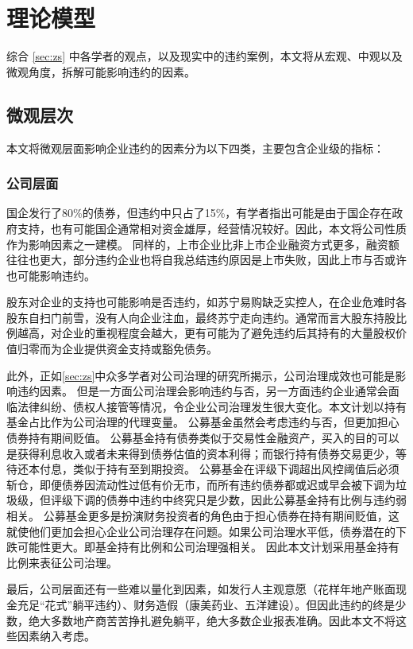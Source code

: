 
\chapter{理论模型}
综合 \ref{sec:zs} 中各学者的观点，以及现实中的违约案例，本文将从宏观、中观以及微观角度，拆解可能影响违约的因素。
\section{微观层次}
本文将微观层面影响企业违约的因素分为以下四类，主要包含企业级的指标：
\subsection{公司层面}

国企发行了80\%的债券，但违约中只占了15\%，有学者指出可能是由于国企存在政府支持\cite{mo2021china}，也有可能国企通常相对资金雄厚，经营情况较好。因此，本文将公司性质作为影响因素之一建模。
同样的，上市企业比非上市企业融资方式更多，融资额往往也更大，部分违约企业也将自我总结违约原因是上市失败，因此上市与否或许也可能影响违约。

股东对企业的支持也可能影响是否违约，如苏宁易购缺乏实控人，在企业危难时各股东自扫门前雪，没有人向企业注血，最终苏宁走向违约。通常而言大股东持股比例越高，对企业的重视程度会越大，更有可能为了避免违约后其持有的大量股权价值归零而为企业提供资金支持或豁免债务。

此外，正如\ref{sec:zs}中众多学者对公司治理的研究所揭示，公司治理成效也可能是影响违约因素。
但是一方面公司治理会影响违约与否，另一方面违约企业通常会面临法律纠纷、债权人接管等情况，令企业公司治理发生很大变化。本文计划以持有基金占比作为公司治理的代理变量。
公募基金虽然会考虑违约与否，但更加担心债券持有期间贬值。
公募基金持有债券类似于交易性金融资产，买入的目的可以是获得利息收入或者未来得到债券估值的资本利得；而银行持有债券交易更少，等待还本付息，类似于持有至到期投资。
公募基金在评级下调超出风控阈值后必须斩仓，即便债券因流动性过低有价无市，而所有违约债券都或迟或早会被下调为垃圾级，但评级下调的债券中违约中终究只是少数，因此公募基金持有比例与违约弱相关。
公募基金更多是扮演财务投资者的角色由于担心债券在持有期间贬值，这就使他们更加会担心企业公司治理存在问题。如果公司治理水平低，债券潜在的下跌可能性更大\Parencite{anginer2018corporate}。即基金持有比例和公司治理强相关。
因此本文计划采用基金持有比例来表征公司治理。

最后，公司层面还有一些难以量化到因素，如发行人主观意愿（花样年地产账面现金充足“花式”躺平违约）、财务造假（康美药业、五洋建设）。但因此违约的终是少数，绝大多数地产商苦苦挣扎避免躺平，绝大多数企业报表准确。因此本文不将这些因素纳入考虑。
